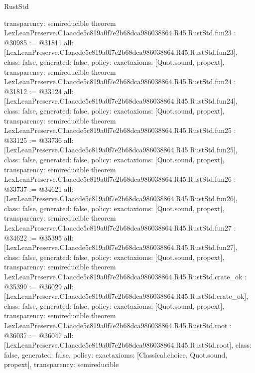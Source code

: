 \begin{lexlean}{RustStd}
\begin{coremodule}
{  transparency: semireducible
}
theorem LexLeanPreserve.C1aacde5c819a0f7e2b68dca986038864.R45.RustStd.fun23 : @30985 := @31811 {
  all: [LexLeanPreserve.C1aacde5c819a0f7e2b68dca986038864.R45.RustStd.fun23],
  class: false,
  generated: false,
  policy: exact{axioms: [Quot.sound, propext]},
  transparency: semireducible
}
theorem LexLeanPreserve.C1aacde5c819a0f7e2b68dca986038864.R45.RustStd.fun24 : @31812 := @33124 {
  all: [LexLeanPreserve.C1aacde5c819a0f7e2b68dca986038864.R45.RustStd.fun24],
  class: false,
  generated: false,
  policy: exact{axioms: [Quot.sound, propext]},
  transparency: semireducible
}
theorem LexLeanPreserve.C1aacde5c819a0f7e2b68dca986038864.R45.RustStd.fun25 : @33125 := @33736 {
  all: [LexLeanPreserve.C1aacde5c819a0f7e2b68dca986038864.R45.RustStd.fun25],
  class: false,
  generated: false,
  policy: exact{axioms: [Quot.sound, propext]},
  transparency: semireducible
}
theorem LexLeanPreserve.C1aacde5c819a0f7e2b68dca986038864.R45.RustStd.fun26 : @33737 := @34621 {
  all: [LexLeanPreserve.C1aacde5c819a0f7e2b68dca986038864.R45.RustStd.fun26],
  class: false,
  generated: false,
  policy: exact{axioms: [Quot.sound, propext]},
  transparency: semireducible
}
theorem LexLeanPreserve.C1aacde5c819a0f7e2b68dca986038864.R45.RustStd.fun27 : @34622 := @35395 {
  all: [LexLeanPreserve.C1aacde5c819a0f7e2b68dca986038864.R45.RustStd.fun27],
  class: false,
  generated: false,
  policy: exact{axioms: [Quot.sound, propext]},
  transparency: semireducible
}
theorem LexLeanPreserve.C1aacde5c819a0f7e2b68dca986038864.R45.RustStd.crate_ok : @35399 := @36029 {
  all: [LexLeanPreserve.C1aacde5c819a0f7e2b68dca986038864.R45.RustStd.crate_ok],
  class: false,
  generated: false,
  policy: exact{axioms: [Quot.sound, propext]},
  transparency: semireducible
}
theorem LexLeanPreserve.C1aacde5c819a0f7e2b68dca986038864.R45.RustStd.root : @36037 := @36047 {
  all: [LexLeanPreserve.C1aacde5c819a0f7e2b68dca986038864.R45.RustStd.root],
  class: false,
  generated: false,
  policy: exact{axioms: [Classical.choice, Quot.sound, propext]},
  transparency: semireducible
}


\end{coremodule}
\end{lexlean}
